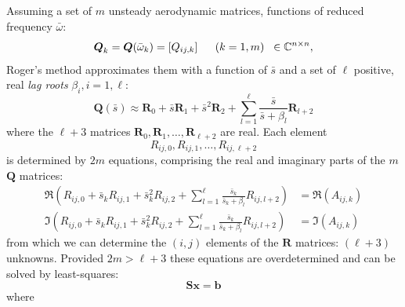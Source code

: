 \documentclass[10pt,openany,twoside]{book}
\numberwithin{equation}{section}   %
\newcommand{\Matrix}[1]{\boldsymbol{#1}}
\newcommand{\Vector}[1]{\boldsymbol{#1}}
\begin{document}
Assuming a set of $m$ unsteady aerodynamic matrices, functions of reduced frequency $\bar{\omega}$:
\begin{equation}
\Matrix{Q}_k = \Matrix{Q}(\bar{\omega}_k) = \left[Q_{ij,k}\right]
			\hspace{5mm} (k = 1, m) \; \; \in \mathbb{C}^{n \times n},
\end{equation}
Roger's method approximates them with a function of $\bar{s}$ 
and a set of $\ell$ positive, real \emph{lag roots} $\beta_i, i=1,\ell$:
\begin{equation}
  \Matrix{Q}(\bar{s}) \approx \Matrix{R}_0 + \bar{s}\Matrix{R}_1 + \bar{s}^2 \Matrix{R}_2 +  \sum_{l=1}^{\ell} \frac{\bar{s}}{\bar{s} + \beta_l} \Matrix{R}_{l+2}
\end{equation}
where the $\ell + 3$ matrices
$\Matrix{R}_0, \Matrix{R}_1, \ldots, \Matrix{R}_{\ell+2}$ are real.
Each element
\begin{displaymath}
R_{ij,0}, R_{ij,1}, \ldots, R_{ij,\ell+2}
\end{displaymath}
is determined by $2m$ equations, comprising the real and imaginary parts
of the $m$ $\Matrix{Q}$ matrices:
\begin{align}
	\Re(R_{ij,0} + \bar{s}_k R_{ij,1}
  		+ \bar{s}_k^2 R_{ij,2} +  \sum_{l=1}^{\ell} \frac{\bar{s}_k}{\bar{s}_k +
			\beta_l} R_{ij,l+2}) &= \Re(A_{ij,k}) \nonumber	\\
	\Im(R_{ij,0} + \bar{s}_k R_{ij,1}
  		+ \bar{s}_k^2 R_{ij,2} +  \sum_{l=1}^{\ell} \frac{\bar{s}_k}{\bar{s}_k +
			\beta_l} R_{ij,l+2}) &= \Im(A_{ij,k})	\nonumber
\end{align}
from which we can determine the $(i,j)$ elements of the $\Matrix{R}$ matrices:
$(\ell+3)$ unknowns. Provided $2m > \ell+3$ these equations are overdetermined
and can be solved by least-squares:
\begin{equation}
\Matrix{S}\Vector{x} = \Vector{b}
\end{equation}
where
\end{document}
